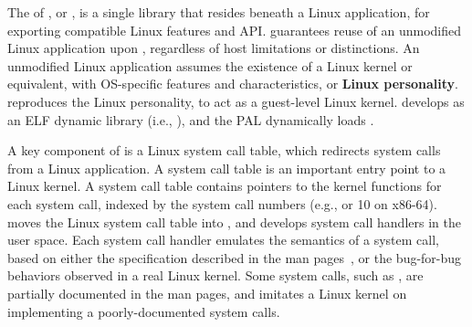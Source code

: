 

The \libos{} of \graphene{}, or 
\thelibos{},
is a single library that resides beneath a Linux application,
for exporting compatible Linux features and API.
\thelibos{} guarantees reuse of an unmodified Linux application
upon \thehostabi{},
regardless of host limitations or distinctions.
An unmodified Linux application assumes the existence of a Linux kernel or equivalent,
with OS-specific features and characteristics,
or {\bf Linux personality}.
\thelibos{} reproduces the Linux personality,
to act as a guest-level Linux kernel.
\graphene{} develops \thelibos{} as an ELF dynamic library (i.e., ),
and the PAL dynamically loads \thelibos{}.


A key component of \thelibos{}
is a Linux system call table, which redirects system calls from a Linux application.
A system call table is an important entry point to a Linux kernel.
A system call table contains
pointers to the kernel functions for each system call,
indexed by the system call numbers (e.g.,  or 10 on x86-64).
\graphene{} moves the Linux system call table into \thelibos{},
and develops system call handlers in the user space.
Each system call handler emulates
the semantics of a system call,
based on either the specification %
described in the man pages~\cite{linux-man-syscall},
or the bug-for-bug behaviors
observed in a real Linux kernel.
Some system calls, such as , are partially documented
in the man pages, and \thelibos{} imitates a Linux kernel on implementing a poorly-documented system calls.


